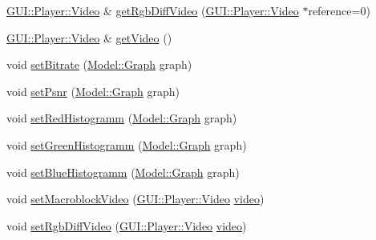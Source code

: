 \begin{DoxyCompactItemize}
\item 
\hyperlink{classGUI_1_1Player_1_1Video}{G\+U\+I\+::\+Player\+::\+Video} \& \hyperlink{classModel_1_1EncodedVideo_a85eb47f3e866632f0e48c89becc72d1a}{get\+Rgb\+Diff\+Video} (\hyperlink{classGUI_1_1Player_1_1Video}{G\+U\+I\+::\+Player\+::\+Video} $\ast$reference=0)
\item 
\hyperlink{classGUI_1_1Player_1_1Video}{G\+U\+I\+::\+Player\+::\+Video} \& \hyperlink{classModel_1_1EncodedVideo_a56ebcfcff7dfad1f4b9e302794451afe}{get\+Video} ()
\item 
void \hyperlink{classModel_1_1EncodedVideo_a60a6dd2db95a7b5512b119592154c542}{set\+Bitrate} (\hyperlink{classModel_1_1Graph}{Model\+::\+Graph} graph)
\item 
void \hyperlink{classModel_1_1EncodedVideo_a1ab9a88bf6af5d5c764512703becc453}{set\+Psnr} (\hyperlink{classModel_1_1Graph}{Model\+::\+Graph} graph)
\item 
void \hyperlink{classModel_1_1EncodedVideo_a50a774bf6d0a0445ad71fce4030f923b}{set\+Red\+Histogramm} (\hyperlink{classModel_1_1Graph}{Model\+::\+Graph} graph)
\item 
void \hyperlink{classModel_1_1EncodedVideo_a566ac8c5c38d5e9ff92033d425ad1af5}{set\+Green\+Histogramm} (\hyperlink{classModel_1_1Graph}{Model\+::\+Graph} graph)
\item 
void \hyperlink{classModel_1_1EncodedVideo_a73e0e302836a23164bc5fafc2efcb412}{set\+Blue\+Histogramm} (\hyperlink{classModel_1_1Graph}{Model\+::\+Graph} graph)
\item 
void \hyperlink{classModel_1_1EncodedVideo_aa7f8f6cccdf2b783931981c42c093fe5}{set\+Macroblock\+Video} (\hyperlink{classGUI_1_1Player_1_1Video}{G\+U\+I\+::\+Player\+::\+Video} \hyperlink{classModel_1_1EncodedVideo_a03e0f42a43f7a856dd9881df4024fb4c}{video})
\item 
void \hyperlink{classModel_1_1EncodedVideo_a9f858252aac3af726c1ba68f580321f9}{set\+Rgb\+Diff\+Video} (\hyperlink{classGUI_1_1Player_1_1Video}{G\+U\+I\+::\+Player\+::\+Video} \hyperlink{classModel_1_1EncodedVideo_a03e0f42a43f7a856dd9881df4024fb4c}{video})
\end{DoxyCompactItemize}
